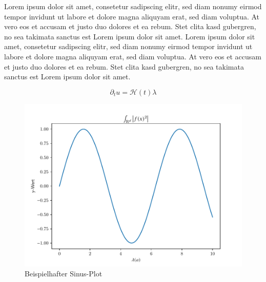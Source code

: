 Lorem ipsum dolor sit amet, consetetur sadipscing elitr, sed diam nonumy eirmod tempor invidunt ut labore et dolore magna aliquyam erat, sed diam voluptua. At vero eos et accusam et justo duo dolores et ea rebum. Stet clita kasd gubergren, no sea takimata sanctus est Lorem ipsum dolor sit amet. Lorem ipsum dolor sit amet, consetetur sadipscing elitr, sed diam nonumy eirmod tempor invidunt ut labore et dolore magna aliquyam erat, sed diam voluptua. At vero eos et accusam et justo duo dolores et ea rebum. Stet clita kasd gubergren, no sea takimata sanctus est Lorem ipsum dolor sit amet.

\begin{equation}
    \partial_t u = \mathcal{H}(t)  \lambda 
\end{equation}

\begin{figure}[H]
    \centering
    \includegraphics[width=1\textwidth]{figures/plot.pdf}
    \caption{Beispielhafter Sinus-Plot}
    \label{fig:sinus}
\end{figure}

